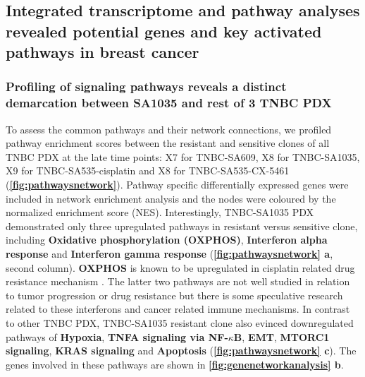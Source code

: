 \subsection{Integrated transcriptome and pathway analyses revealed potential genes and key activated pathways in breast cancer}

\subsubsection{Profiling of signaling pathways reveals a distinct demarcation between SA1035 and rest of 3 TNBC PDX}
To assess the common pathways and their network connections, 
we profiled pathway enrichment scores between the resistant and sensitive clones of all TNBC PDX at the late time points:  X7 for TNBC-SA609, X8 for TNBC-SA1035, X9 for TNBC-SA535-cisplatin and X8 for TNBC-SA535-CX-5461 (\textbf{\autoref{fig:pathwaysnetwork}}). 
Pathway specific differentially expressed genes were included in network enrichment analysis and the nodes were coloured by the normalized enrichment score (NES). Interestingly, TNBC-SA1035 PDX demonstrated only three upregulated pathways in resistant versus sensitive clone, including \textbf{Oxidative phosphorylation (OXPHOS)}, \textbf{Interferon alpha response} \cite{provance2019deciphering} and \textbf{Interferon gamma response} \cite{mojic2018dark} (\textbf{\autoref{fig:pathwaysnetwork} a}, second column). \textbf{\ac{OXPHOS}} is known to be upregulated in cisplatin related drug resistance mechanism \cite{lee2017myc}. The latter two pathways are not well studied in relation to tumor progression or drug resistance but there is some speculative research related to these interferons and cancer related immune mechanisms. In contrast to other TNBC PDX, TNBC-SA1035 resistant clone also evinced downregulated pathways of \textbf{Hypoxia}, \textbf{TNFA signaling via NF-$\kappa$B}, \textbf{\ac{EMT}}, \textbf{MTORC1 signaling}, \textbf{KRAS signaling} and \textbf{Apoptosis} ({\textbf{\autoref{fig:pathwaysnetwork} c}}). The genes involved in these pathways are shown in \textbf{\autoref{fig:genenetworkanalysis} b}.


